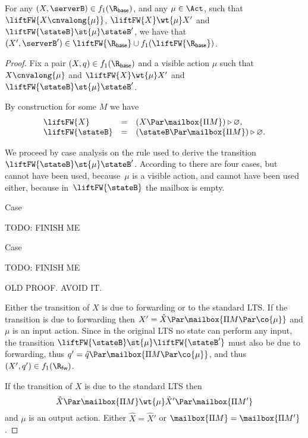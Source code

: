 {  

  
  \begin{lemma}
    \label{lem:preservation-coind-continuations-mu-2}
    For any $(X, \serverB) \in f_1( \Rbase )$,
    and any $\mu \in \Act$,
    such that $\liftFW{X \cnvalong{\mu}}$, $\liftFW{X} \wt{\mu} X'$ and $\liftFW{\stateB} \st{\mu} \stateB'$,
    we have that $(X', \serverB') \in \liftFW{\Rbase} \cup f_1(\liftFW{\Rbase} )$.
  \end{lemma}
  \begin{proof}
    Fix a pair $(X, q) \in f_1(\Rbase)$ and a visible action $\mu$ such that $X \cnvalong{\mu}$
    and $\liftFW{ X } \wt{\mu } X' $ and $\liftFW{\stateB} \st{\mu} \stateB' $.

    By construction for some $M$ we have
    $$
    \begin{array}{lll}
      \liftFW{ X } & = & (X \Par \mailbox{\Pi M}) \triangleright \varnothing,\\
      \liftFW{ \stateB } & = & (\stateB \Par \mailbox{\Pi M}) \triangleright \varnothing.
    \end{array}
    $$

    We proceed by case analysis on the rule used to derive the transition
    $\liftFW{\stateB} \st{\mu} \stateB' $.
    According to 
    there are four cases, but  cannot have been used,
    because~$\mu$ is a visible action, and  cannot have been used either,
    because in~$\liftFW{\stateB}$ the mailbox is empty.

    Case 
    
    TODO: FINISH ME

    Case 

    TODO: FINISH ME

    
    \bigskip
    
    OLD PROOF. AVOID IT.
    
    Either the transition of $X$ is due to forwarding or to the standard LTS.
    If the transition is due to forwarding then $X' = \hat{X} \Par \mailbox{\Pi M \Par \co{ \mu} } $
    and $\mu$ is an input action. Since in the original LTS no state can perform any input,
    the transition $\liftFW{\stateB}  \st{\mu} \liftFW{\stateB'} $ must also be due to forwarding,
    thus $q' =  \hat{q} \Par \mailbox{\Pi M \Par \co{ \mu}}$,
    and thus $(X', q') \in f_1(\Rfw)$.

    
    If the transition of $X$ is due to the standard LTS then
    $$
    \hat{X} \Par \mailbox{\Pi M} \wt{\mu} \hat{X}' \Par \mailbox{\Pi M'}
    $$
    and $\mu$ is an output action.
    Either $\hat{X} = \hat{X}'$ or $\mailbox{\Pi M} = \mailbox{\Pi M'}$.


\end{proof}}
